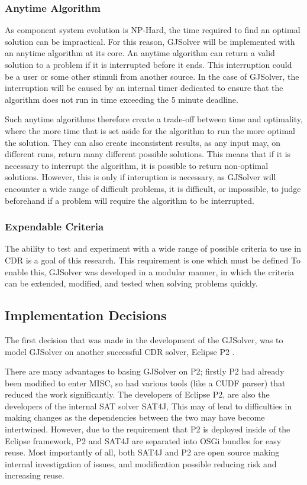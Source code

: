 \subsubsection{Anytime Algorithm}
As component system evolution is NP-Hard, the time required to find an optimal solution can be impractical.
For this reason, GJSolver will be implemented with an anytime algorithm at its core.
An anytime algorithm can return a valid solution to a problem if it is interrupted before it ends.
This interruption could be a user or some other stimuli from another source.
In the case of GJSolver, the interruption will be caused by an internal timer dedicated to ensure that the algorithm does not run in time exceeding the 5 minute deadline.

Such anytime algorithms therefore create a trade-off between time and optimality, where the more time that is set aside for the algorithm to run the more optimal the solution. 
They can also create inconsistent results, as any input may, on different runs, return many different possible solutions.
This means that if it is necessary to interrupt the algorithm, it is possible to return non-optimal solutions.
However, this is only if interuption is necessary, as GJSolver will encounter a wide range of difficult problems, 
it is difficult, or impossible, to judge beforehand if a problem will require the algorithm to be interrupted. 

\subsubsection{Expendable Criteria}
The ability to test and experiment with a wide range of possible criteria to use in CDR is a goal of this research.
This requirement is one which must be defined
To enable this, GJSolver was developed in a modular manner, in which the criteria can be extended, modified, and tested when solving problems quickly.

\subsection{Implementation Decisions}
The first decision that was made in the development of the GJSolver, was to model GJSolver on another successful CDR solver, Eclipse P2 \citep{le_berre_dependency_2009,leBerre2010}.

There are many advantages to basing GJSolver on P2; firstly P2 had already been modified to enter MISC, so had various tools (like a CUDF parser) that reduced the work significantly.
The developers of Eclipse P2, are also the developers of the internal SAT solver SAT4J,
This may of lead to difficulties in making changes as the dependencies between the two may have become intertwined.
However, due to the requirement that P2 is deployed inside of the Eclipse framework, P2 and SAT4J are separated into OSGi bundles for easy reuse.
Most importantly of all, both SAT4J and P2 are open source making internal investigation of issues, and modification possible reducing risk and increasing reuse.


